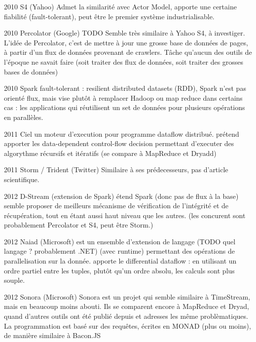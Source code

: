   2010    S4 (Yahoo)                                        Admet la similarité avec Actor Model, apporte une certaine fiabilité (fault-tolerant), peut être le premier système industrialisable.

  2010     Percolator (Google)                                    TODO Semble très similaire à Yahoo S4, à investiger. L'idée de Percolator, c'est de mettre à jour une grosse base de données de pages, à partir d'un flux de données provenant de crawlers. Tâche qu'aucun des outils de l'époque ne savait faire (soit traiter des flux de données, soit traiter des grosses bases de données)

  2010    Spark                                          fault-tolerant : resilient distributed datasets (RDD), Spark n'est pas orienté flux, mais vise plutôt à remplacer Hadoop ou map reduce dans certains cas : les applications qui réutilisent un set de données pour plusieurs opérations en parallèles.

  2011     Ciel                                          un moteur d'execution pour programme dataflow distribué. prétend apporter les data-dependent control-flow decision permettant d'executer des algorythme récursifs et itératifs (se compare à MapReduce et Dryadd)

  2011    Storm / Trident (Twitter)                                Similaire à ses prédecesseurs, pas d'article scientifique.

  2012    D-Stream (extension de Spark)                              étend Spark (donc pas de flux à la base) semble proposer de meilleurs mécanisme de vérification de l'intégrité et de récupération, tout en étant aussi haut niveau que les autres. (les concurent sont probablement Percolator et S4, peut être Storm.)

  2012     Naiad (Microsoft)                                  est un ensemble d'extension de langage (TODO quel langage ? probablement .NET) (avec runtime) permettant des opérations de parallelisation sur la donnée. apporte le differential dataflow : en utilisant un ordre partiel entre les tuples, plutôt qu'un ordre absolu, les calculs sont plus souple.

  2012    Sonora (Microsoft)                                    Sonora est un projet qui semble similaire à TimeStream, mais en beaucoup moins abouti. Ils se comparent encore à MapReduce et Dryad, quand d'autres outils ont été publié depuis et adresses les même problèmatiques.
  La programmation est basé sur des requêtes, écrites en MONAD (plus ou moins), de manière similaire à Bacon.JS

